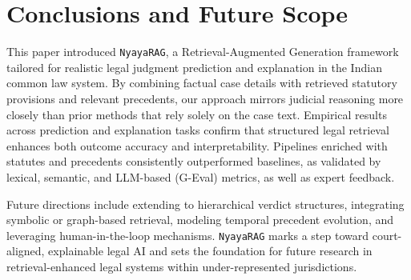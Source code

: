 \section{Conclusions and Future Scope}
\label{sec:conclusion_future_scope}

This paper introduced \texttt{NyayaRAG}, a Retrieval-Augmented Generation framework tailored for realistic legal judgment prediction and explanation in the Indian common law system. By combining factual case details with retrieved statutory provisions and relevant precedents, our approach mirrors judicial reasoning more closely than prior methods that rely solely on the case text.
% 
Empirical results across prediction and explanation tasks confirm that structured legal retrieval enhances both outcome accuracy and interpretability. Pipelines enriched with statutes and precedents consistently outperformed baselines, as validated by lexical, semantic, and LLM-based (G-Eval) metrics, as well as expert feedback.

Future directions include extending to hierarchical verdict structures, integrating symbolic or graph-based retrieval, modeling temporal precedent evolution, and leveraging human-in-the-loop mechanisms. \texttt{NyayaRAG} marks a step toward court-aligned, explainable legal AI and sets the foundation for future research in retrieval-enhanced legal systems within under-represented jurisdictions.




